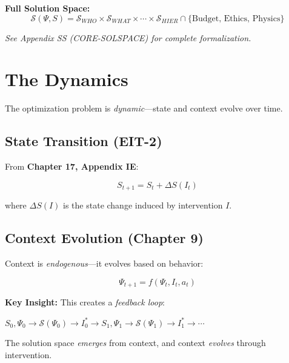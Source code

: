 \textbf{Full Solution Space:}
\begin{equation}
\mathcal{S}(\Psi, S) = \mathcal{S}_{WHO} \times \mathcal{S}_{WHAT} \times \cdots \times \mathcal{S}_{HIER} \cap \{\text{Budget, Ethics, Physics}\}
\end{equation}

\textit{See Appendix SS (CORE-SOLSPACE) for complete formalization.}

\section{The Dynamics}
\label{sec:mp-dynamics}

The optimization problem is \textit{dynamic}---state and context evolve over time.

\subsection{State Transition (EIT-2)}

From \textbf{Chapter 17, Appendix IE}:

\begin{equation}
\boxed{
S_{t+1} = S_t + \Delta S(I_t)
}
\label{eq:mp-state-transition}
\end{equation}

where $\Delta S(I)$ is the state change induced by intervention $I$.

\subsection{Context Evolution (Chapter 9)}

Context is \textit{endogenous}---it evolves based on behavior:

\begin{equation}
\boxed{
\Psi_{t+1} = f(\Psi_t, I_t, a_t)
}
\label{eq:mp-context-evolution}
\end{equation}

\textbf{Key Insight:} This creates a \textit{feedback loop}:
\begin{center}
$S_0, \Psi_0 \to \mathcal{S}(\Psi_0) \to I^*_0 \to S_1, \Psi_1 \to \mathcal{S}(\Psi_1) \to I^*_1 \to \cdots$
\end{center}

The solution space \textit{emerges} from context, and context \textit{evolves} through intervention.

